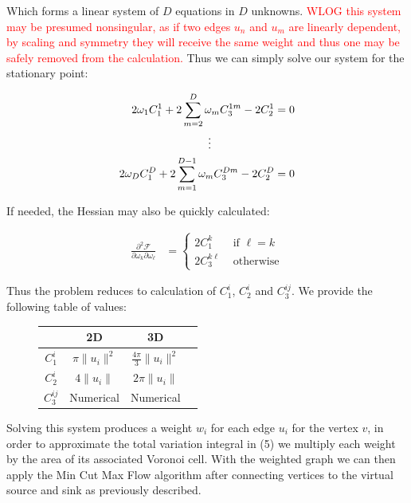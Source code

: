 \documentclass[12pt]{article}
\begin{document}
Which forms a linear system of $D$ equations in $D$ unknowns. \textcolor{red}{WLOG this system may be presumed nonsingular, as if two edges $u_n$ and $u_m$ are linearly dependent, by scaling and symmetry they will receive the same weight and thus one may be safely removed from the calculation.} Thus we can simply solve our system for the stationary point:

\begin{align*}
2 \omega_1 C_1^1 + 2 \sum_{m=2}^{D}\omega_{m}C_{3}^{1m}  - 2 C_2^1 &= 0\\
\vdots \hspace{20mm} & \\
2 \omega_D C_1^D + 2 \sum_{m=1}^{D-1}\omega_{m}C_{3}^{Dm} - 2 C_2^D &= 0\\
\end{align*}

If needed, the Hessian may also be quickly calculated:

\begin{align*}
\frac{\partial^2 \mathcal{F}}{\partial \omega_k \partial \omega_\ell} &= \begin{cases}
2C_1^k & \text{ if } \ell = k\\
2C_3^{k\ell} & \text{ otherwise}
\end{cases}
\end{align*}

Thus the problem reduces to calculation of $C_1^i$, $C_2^i$ and $C_3^{ij}$. We provide the following table of values:

\begin{figure}[H]
\centering
\begin{tabular}{|c|c|c|c|}
\hline
 &  2D  & 3D  \\
\hline
 $C_1^i$ & $\pi \| u_i \|^2$  & $\frac{4\pi}{3}\|u_i\|^2$   \\
\hline
 $C_2^i$ & $4\| u_i \|$  & $2\pi \|u_i\|$    \\
\hline
 $C_3^{ij}$ & Numerical  & Numerical    \\
\hline
\end{tabular}
\end{figure}

Solving this system produces a weight $w_i$ for each edge $u_i$ for the vertex $v$, in order to approximate the total variation integral in (5) we multiply each weight by the area of its associated Voronoi cell. With the weighted graph we can then apply the Min Cut Max Flow algorithm after connecting vertices to the virtual source and sink as previously described. 
\end{document}
